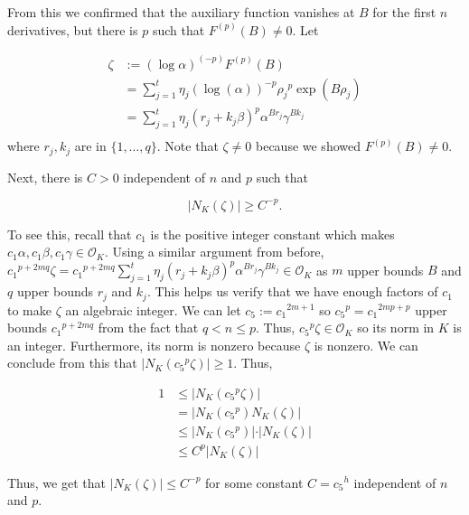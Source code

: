 \documentclass[a4paper, 11pt]{book}
\begin{document}
From this we confirmed that the auxiliary function vanishes at $B$ for the first $n$ derivatives, but there is $p$ such that $F^{(p)}(B) \neq 0$. Let 

\begin{align*}
    \zeta &:= {(\log \alpha)}^{(-p)}F^{(p)}(B) \\
          &= \sum\limits_{j=1}^{t}\eta_{j}{\left(\log(\alpha)\right)}^{-p}{\rho_{j}}^{p}\exp(B\rho_j) \\
          &= \sum\limits_{j=1}^{t} \eta_{j}{\left(r_j + k_j \beta\right)}^{p}{\alpha}^{Br_{j}}{\gamma}^{Bk_{j}} \\
\end{align*}
where $r_j, k_j$ are in $\{1, \ldots, q\}$. Note that $\zeta \neq 0$ because we showed $F^{(p)}(B) \neq 0$.\par

Next, there is $C > 0$ independent of $n$ and $p$ such that 

\[\vert N_{K}(\zeta) \vert \geq C^{-p}.\]

To see this, recall that $c_1$ is the positive integer constant which makes $c_1\alpha, c_1\beta, c_1\gamma \in \mathcal{O}_K$. Using a similar argument from before, ${c_1}^{p+2mq} \zeta = {c_1}^{p + 2mq}\sum\limits_{j=1}^{t}{\eta_{j}\left(r_j + k_j \beta\right)}^{p}{\alpha}^{Br_{j}}{\gamma}^{Bk_{j}} \in \mathcal{O}_K$ as $m$ upper bounds $B$ and $q$ upper bounds $r_j$ and $k_j$. This helps us verify that we have enough factors of $c_1$ to make $\zeta$ an algebraic integer. We can let $c_5 := {c_1}^{2m+1}$ so ${c_5}^p = {c_1}^{2mp + p}$ upper bounds ${c_1}^{p + 2mq}$ from the fact that $q < n \leq p$. Thus, ${c_5}^{p}\zeta \in \mathcal{O}_K$ so its norm in $K$ is an integer. Furthermore, its norm is nonzero because $\zeta$ is nonzero.  We can conclude from this that $\vert N_K({c_5}^{p}\zeta) \vert \geq 1$. Thus,

\begin{align*}
    1 &\leq \vert N_K({c_5}^{p}\zeta) \vert \\
      &= \vert N_K({c_5}^{p}) N_K(\zeta) \vert \\
      &\leq \vert N_K({c_5}^{p}) \vert \cdot \vert N_K(\zeta) \vert \\
      & \leq C^{p}\vert N_K(\zeta) \vert
\end{align*}

Thus, we get that $\vert N_K(\zeta) \vert \leq C^{-p}$ for some constant $C = {c_5}^{h}$ independent of $n$ and $p$.\par
\end{document}
